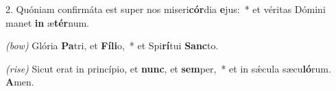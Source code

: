 2. Quóniam confirmáta est super nos miseri\textbf{cór}dia \textbf{e}jus:~* et véritas Dómini manet \textbf{in} æ\textbf{tér}num.

\textit{(bow)} Glória \textbf{Pa}tri, et \textbf{Fí}\textbf{li}o,~* et Spi\textbf{rí}tui \textbf{Sanc}to.

\textit{(rise)} Sicut erat in princípio, et \textbf{nunc}, et \textbf{sem}per,~* et in s\'{\ae}cula sæcu\textbf{ló}rum. \textbf{A}men.